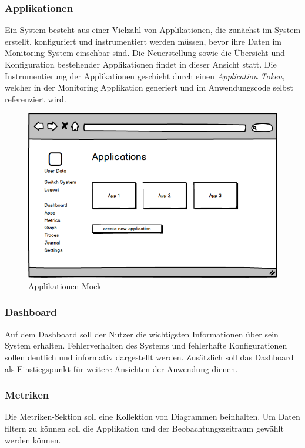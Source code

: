 \subsubsection{Applikationen}

Ein System besteht aus einer Vielzahl von Applikationen, die zunächst im System erstellt,
konfiguriert und instrumentiert werden müssen, bevor ihre Daten im Monitoring System einsehbar sind.
Die Neuerstellung sowie die Übersicht und Konfiguration bestehender Applikationen
findet in dieser Ansicht statt. Die Instrumentierung der Applikationen
geschieht durch einen \emph{Application Token}, welcher in der Monitoring
Applikation generiert und im Anwendungscode selbst referenziert wird.


\vspace{0.3cm}

\begin{figure}[h]
 \centering
 \includegraphics[width=0.6\linewidth]{kapitel1/mocks/apps.png}
 \caption{Applikationen Mock}
 \label{fig:apps}
\end{figure}


\subsubsection{Dashboard}

Auf dem Dashboard soll der Nutzer die wichtigsten Informationen über sein System erhalten.
Fehlerverhalten des Systems und fehlerhafte Konfigurationen sollen deutlich und informativ dargestellt werden.
Zusätzlich soll das Dashboard als Einstiegspunkt für weitere Ansichten der Anwendung dienen.

\subsubsection{Metriken}

Die Metriken-Sektion soll eine Kollektion von Diagrammen beinhalten.
Um Daten filtern zu können soll die Applikation und der Beobachtungszeitraum gewählt werden können.

